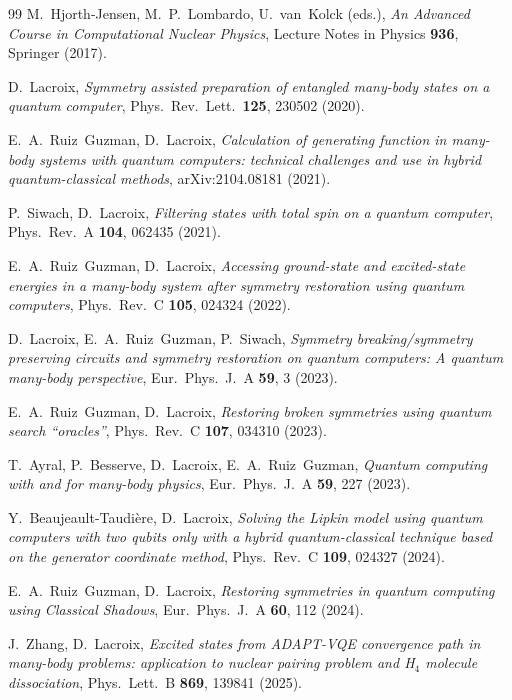 \documentclass[
  aps,            %
  prc,            %
  reprint,        %
  superscriptaddress,
  floatfix,
  nofootinbib
]{revtex4-2}
\begin{document}
\begin{thebibliography}{99}
M.~Hjorth-Jensen, M.~P.~Lombardo, U.~van~Kolck (eds.),
\textit{An Advanced Course in Computational Nuclear Physics},
Lecture Notes in Physics \textbf{936}, Springer (2017).

D.~Lacroix,
\textit{Symmetry assisted preparation of entangled many-body states on a quantum computer},
Phys.\ Rev.\ Lett.\ \textbf{125}, 230502 (2020).

E.~A.~Ruiz~Guzman, D.~Lacroix,
\textit{Calculation of generating function in many-body systems with quantum computers: technical challenges and use in hybrid quantum-classical methods},
arXiv:2104.08181 (2021).

P.~Siwach, D.~Lacroix,
\textit{Filtering states with total spin on a quantum computer},
Phys.\ Rev.\ A \textbf{104}, 062435 (2021).

E.~A.~Ruiz~Guzman, D.~Lacroix,
\textit{Accessing ground-state and excited-state energies in a many-body system after symmetry restoration using quantum computers},
Phys.\ Rev.\ C \textbf{105}, 024324 (2022).

D.~Lacroix, E.~A.~Ruiz~Guzman, P.~Siwach,
\textit{Symmetry breaking/symmetry preserving circuits and symmetry restoration on quantum computers: A quantum many-body perspective},
Eur.\ Phys.\ J.\ A \textbf{59}, 3 (2023).

E.~A.~Ruiz~Guzman, D.~Lacroix,
\textit{Restoring broken symmetries using quantum search ``oracles''},
Phys.\ Rev.\ C \textbf{107}, 034310 (2023).

T.~Ayral, P.~Besserve, D.~Lacroix, E.~A.~Ruiz~Guzman,
\textit{Quantum computing with and for many-body physics},
Eur.\ Phys.\ J.\ A \textbf{59}, 227 (2023).

Y.~Beaujeault-Taudi\`ere, D.~Lacroix,
\textit{Solving the Lipkin model using quantum computers with two qubits only with a hybrid quantum-classical technique based on the generator coordinate method},
Phys.\ Rev.\ C \textbf{109}, 024327 (2024).

E.~A.~Ruiz~Guzman, D.~Lacroix,
\textit{Restoring symmetries in quantum computing using Classical Shadows},
Eur.\ Phys.\ J.\ A \textbf{60}, 112 (2024).

J.~Zhang, D.~Lacroix,
\textit{Excited states from ADAPT-VQE convergence path in many-body problems: application to nuclear pairing problem and H$_4$ molecule dissociation},
Phys.\ Lett.\ B \textbf{869}, 139841 (2025).


\end{thebibliography}
\end{document}
